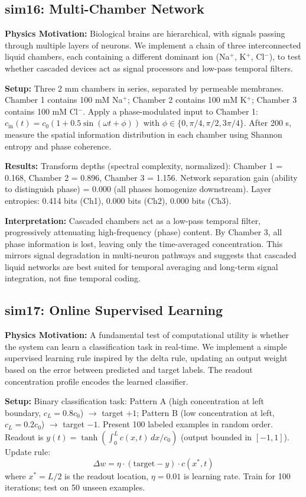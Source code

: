 \documentclass[11pt]{article}
\begin{document}
\subsection{sim16: Multi-Chamber Network}

\textbf{Physics Motivation:} Biological brains are hierarchical, with signals passing through multiple layers of neurons. We implement a chain of three interconnected liquid chambers, each containing a different dominant ion (Na$^+$, K$^+$, Cl$^-$), to test whether cascaded devices act as signal processors and low-pass temporal filters.

\textbf{Setup:} Three 2 mm chambers in series, separated by permeable membranes. Chamber 1 contains 100 mM Na$^+$; Chamber 2 contains 100 mM K$^+$; Chamber 3 contains 100 mM Cl$^-$. Apply a phase-modulated input to Chamber 1: $c_{\text{in}}(t) = c_0 (1 + 0.5 \sin(\omega t + \phi))$ with $\phi \in \{0, \pi/4, \pi/2, 3\pi/4\}$. After 200 s, measure the spatial information distribution in each chamber using Shannon entropy and phase coherence.

\textbf{Results:} Transform depths (spectral complexity, normalized): Chamber 1 = 0.168, Chamber 2 = 0.896, Chamber 3 = 1.156. Network separation gain (ability to distinguish phase) = 0.000 (all phases homogenize downstream). Layer entropies: 0.414 bits (Ch1), 0.000 bits (Ch2), 0.000 bits (Ch3).

\textbf{Interpretation:} Cascaded chambers act as a low-pass temporal filter, progressively attenuating high-frequency (phase) content. By Chamber 3, all phase information is lost, leaving only the time-averaged concentration. This mirrors signal degradation in multi-neuron pathways and suggests that cascaded liquid networks are best suited for temporal averaging and long-term signal integration, not fine temporal coding.

\subsection{sim17: Online Supervised Learning}

\textbf{Physics Motivation:} A fundamental test of computational utility is whether the system can learn a classification task in real-time. We implement a simple supervised learning rule inspired by the delta rule, updating an output weight based on the error between predicted and target labels. The readout concentration profile encodes the learned classifier.

\textbf{Setup:} Binary classification task: Pattern A (high concentration at left boundary, $c_L = 0.8 c_0$) $\to$ target $+1$; Pattern B (low concentration at left, $c_L = 0.2 c_0$) $\to$ target $-1$. Present 100 labeled examples in random order. Readout is $y(t) = \tanh(\int_0^L c(x,t) \, dx / c_0)$ (output bounded in $[-1, 1]$). Update rule:
\begin{equation}
\Delta w = \eta \cdot (\text{target} - y) \cdot c(x^*, t)
\end{equation}
where $x^* = L/2$ is the readout location, $\eta = 0.01$ is learning rate. Train for 100 iterations; test on 50 unseen examples.
\end{document}

